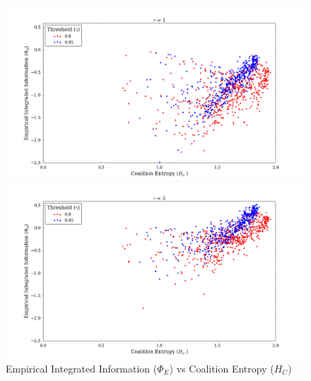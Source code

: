 \documentclass[a4paper,11pt]{article}
\begin{document}
\begin{figure}[H] 
	\begin{minipage}[b]{0.5\linewidth}
		\begin{center}
		\includegraphics[scale = 0.2]{figures/snn/phi_vs_hc_1}
		\end{center}
		\vspace{4ex}
	\end{minipage}
	\begin{minipage}[b]{0.5\linewidth}
		\begin{center}
		\includegraphics[scale = 0.2]{figures/snn/phi_vs_hc_5}
		\end{center}
		\vspace{4ex}
	\end{minipage}
	\caption{
		Empirical Integrated Information ($\Phi_E$) vs Coalition Entropy ($H_C$)
		\label{fig:phi_vs_hc}
	}
\end{figure}

\end{document}
